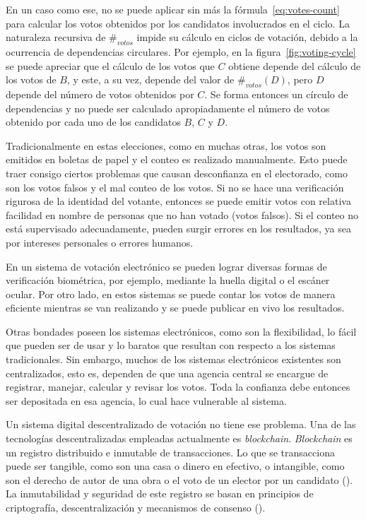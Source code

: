 En un  caso como ese, no se puede aplicar sin m\'as la f\'ormula~\eqref{eq:votes-count} para calcular los votos obtenidos por los candidatos involucrados en el ciclo.  La naturaleza recursiva de $\#_{votos}$ impide su c\'alculo en ciclos de votaci\'on, debido a la ocurrencia de dependencias circulares. Por ejemplo, en la figura~\ref{fig:voting-cycle} se puede apreciar que el c\'alculo de los votos que $C$ obtiene depende del c\'alculo de los votos de $B$, y este, a su vez, depende del valor de $\#_{votos}(D)$, pero $D$ depende del n\'umero de votos obtenidos por $C$. Se forma entonces un c\'irculo de dependencias y no puede ser calculado apropiadamente el n\'umero de votos obtenido por cada uno de los candidatos $B$, $C$ y $D$.




Tradicionalmente en estas elecciones, como en muchas otras, los votos son emitidos en boletas de papel y el conteo es realizado manualmente. Esto puede traer consigo ciertos problemas que causan desconfianza en el electorado, como son los votos falsos y el mal conteo de los votos.   Si no se hace una verificaci\'on rigurosa de la identidad del votante, entonces se puede emitir votos con relativa facilidad en nombre de personas que no han votado (votos falsos). Si el conteo no est\'a supervisado adecuadamente, pueden surgir errores en los resultados, ya sea por intereses personales o errores humanos.

En un sistema de votaci\'on electr\'onico se  pueden lograr diversas formas de verificaci\'on biom\'etrica, por ejemplo, mediante la huella digital o el esc\'aner ocular. Por otro lado, en estos sistemas se puede contar los votos de manera eficiente mientras se van realizando y se  puede publicar en vivo los resultados. 

Otras bondades poseen los sistemas electrónicos, como son la flexibilidad, lo fácil que pueden ser de usar y lo baratos que resultan con respecto a los sistemas tradicionales. Sin embargo, muchos de los sistemas electrónicos existentes son centralizados, esto es, dependen de que una agencia central se encargue de registrar, manejar, calcular y revisar los votos. Toda la confianza debe entonces ser depositada en esa agencia, lo cual hace vulnerable al sistema.
 
Un sistema digital descentralizado de votación no tiene ese problema. Una de las tecnologías descentralizadas empleadas actualmente es \textit{blockchain}.   \textit{Blockchain} es un registro distribuido e inmutable  de transacciones. Lo que se transacciona puede ser tangible, como son  una casa o dinero en efectivo, o intangible, como son el derecho de autor de una obra o el voto de un elector por un candidato (\cite{blockchain-ibm}). La inmutabilidad y seguridad de este registro se basan en principios de  criptografía, descentralizaci\'on y mecanismos de consenso (\cite{blockch-security-ibm}). 


